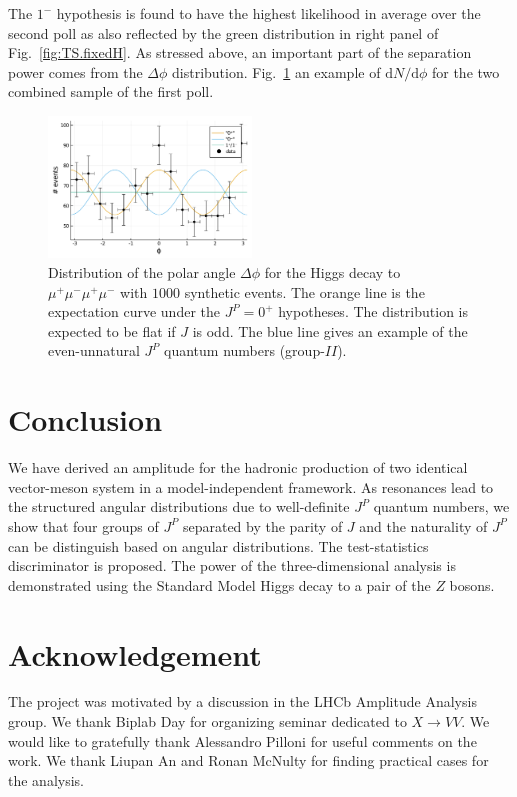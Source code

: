 \documentclass[prd,preprintnumbers,floatfix,
nofootinbib,superscriptaddress]{revtex4}
\newcommand{\diff}{\mathrm{d}}
\newcommand{\II}{\ensuremath{{I\!I}}}
\begin{document}
The $1^-$ hypothesis is found to have the highest likelihood in average over the second poll as also reflected by the green distribution
in right panel of Fig.~\ref{fig:TS.fixedH}. As stressed above, an important part of the separation power comes from the $\Delta\phi$ distribution.
Fig.~\ref{fig:higgs.phi} an example of $\diff N / \diff \phi$ for the two combined sample of the first poll.
\begin{figure}
  \includegraphics[width=0.48\textwidth]{../plots/phi_higgs.pdf}
  \caption{Distribution of the polar angle $\Delta\phi$ for the Higgs decay to $\mu^+\mu^-\mu^+\mu^-$ with $1000$ synthetic events.
  The orange line is the expectation curve under the $J^P=0^+$ hypotheses.
  The distribution is expected to be flat if $J$ is odd.
  The blue line gives an example of the even-unnatural $J^P$ quantum numbers (group-\II).}
  \label{fig:higgs.phi}
\end{figure}

\section{Conclusion}
We have derived an amplitude for the hadronic production of two identical vector-meson system in a model-independent framework.
As resonances lead to the structured angular distributions due to well-definite $J^P$ quantum numbers,
we show that four groups of $J^P$ separated by the parity of $J$ and the naturality of $J^P$ can be distinguish based on angular distributions.
The test-statistics discriminator is proposed.
The power of the three-dimensional analysis is demonstrated using the Standard Model Higgs decay to a pair of the $Z$ bosons.

\section*{Acknowledgement}
The project was motivated by a discussion in the LHCb Amplitude Analysis group.
We thank Biplab Day for organizing seminar dedicated to $X\to VV$.
We would like to gratefully thank Alessandro Pilloni for useful comments on the work.
We thank Liupan An and Ronan McNulty for finding practical cases for the analysis.
\end{document}
